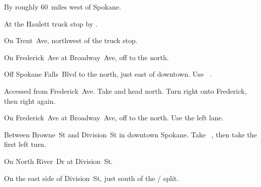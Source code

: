 
\begin{LocationList}

By  roughly 60~miles west of Spokane. %

At the Haulett truck stop by  .

\Location{\GarageHQ \Garage}
On Trent~Ave, northwest of the truck stop.

On Frederick~Ave at Broadway~Ave, off   to the north.

Off Spokane Falls~Blvd to the north, just east of downtown.
Use~ .

Accessed from Frederick~Ave.
Take   and head north.
Turn right onto Frederick, then right again.

On Frederick~Ave at Broadway~Ave, off   to the north.
Use the left lane.

Between Browne~St and Division~St in downtown Spokane.
Take~ , then take the first left turn.

On North River~Dr at   Division~St.

On the east side of Division~St, just south of the  /  split.

\end{LocationList}
